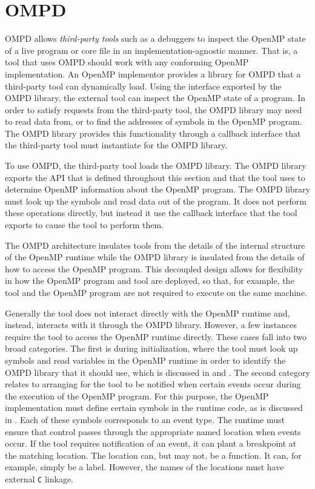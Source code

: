 \section{OMPD}
\label{sec:ompd-overview}
\label{sec:third-party-tool-callback-interface}

OMPD allows \emph{third-party tools} such as a debuggers to inspect the 
OpenMP state of a live program or core file in an implementation-agnostic 
manner. That is, a tool that uses OMPD should work with any conforming 
OpenMP implementation. An OpenMP implementor provides a library for OMPD 
that a third-party tool can dynamically load. Using the interface exported 
by the OMPD library, the external tool can inspect the OpenMP state of a 
program. In order to satisfy requests from the third-party tool, the OMPD 
library may need to read data from, or to find the addresses of symbols in 
the OpenMP program. The OMPD library provides this functionality through a 
callback interface that the third-party tool must instantiate for the OMPD library.

To use OMPD, the third-party tool loads the OMPD library. The OMPD library exports 
the API that is defined throughout this section and that the tool uses to 
determine OpenMP information about the OpenMP program. The OMPD library must
look up the symbols and read data out of the program. It does not perform
these operations directly, but instead it use the callback interface that the
tool exports to cause the tool to perform them.

The OMPD architecture insulates tools from the details of the internal structure 
of the OpenMP runtime while the OMPD library is insulated from the details of how 
to access the OpenMP program. This decoupled design allows for flexibility in how 
the OpenMP program and tool are deployed, so that, for example, the tool and the 
OpenMP program are not required to execute on the same machine.

Generally the tool does not interact directly with the OpenMP runtime and, 
instead, interacts with it through the OMPD library. However, a few instances 
require the tool to access the OpenMP runtime directly. These cases fall into 
two broad categories. The first is during initialization, where the tool must
look up symbols and read variables in the OpenMP runtime in order to identify 
the OMPD library that it should use, which is discussed in 
 and 
. The second category relates to 
arranging for the tool to be notified when certain events occur during the 
execution of the OpenMP program. For this purpose, the OpenMP implementation
must define certain symbols in the runtime code, as is discussed in 
. Each of these symbols corresponds 
to an event type. The runtime must ensure that control passes through the 
appropriate named location when events occur. If the tool requires notification 
of an event, it can plant a breakpoint at the matching location. The location 
can, but may not, be a function. It can, for example, simply be a label. However, 
the names of the locations must have external \texttt{C} linkage.

